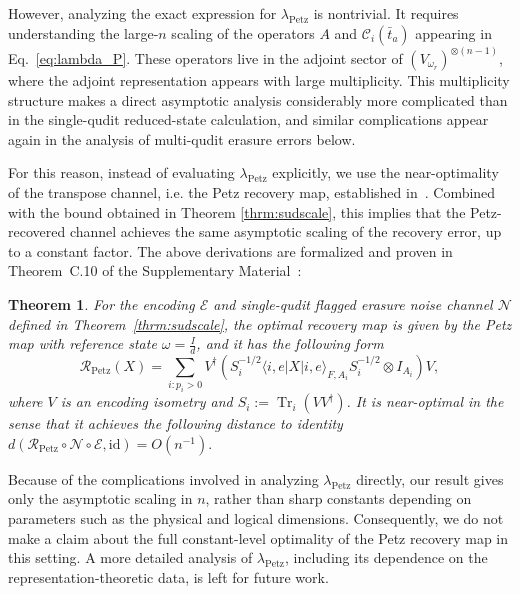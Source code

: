 \documentclass[10pt,twocolumn,superscriptaddress,aps,amsmath,amssymb,citeautoscript,floatfix,prx,longbibliography]{revtex4-2}
\newtheorem{theorem}{Theorem}
\theoremstyle{plain}
\theoremstyle{plain}
\theoremstyle{plain}
\theoremstyle{plain}
\theoremstyle{plain}
\theoremstyle{plain}
\begin{document}
However, analyzing the exact expression for \(\lambda_{\mathrm{Petz}}\) is nontrivial. It requires understanding the large-\(n\) scaling of the operators
\(A\) and \(\mathcal C_i(\bar t_a)\) appearing in Eq.~\eqref{eq:lambda_P}. These operators live in the adjoint sector of \((V_{\omega_r})^{\otimes(n-1)}\), where the adjoint representation appears with large multiplicity. This multiplicity
structure makes a direct asymptotic analysis considerably more complicated than in the single-qudit reduced-state calculation, and similar complications appear again in the analysis of multi-qudit erasure errors below.

For this reason, instead of evaluating \(\lambda_{\mathrm{Petz}}\) explicitly, we use the near-optimality of the transpose channel, i.e. the Petz recovery map, established in~\cite{Ng2010}. Combined with the bound obtained in Theorem \ref{thrm:sudscale}, this implies that the Petz-recovered channel achieves the same asymptotic scaling of the recovery error, up to a constant factor. The above derivations are formalized and proven in Theorem~C.10 of the Supplementary Material~\cite{SuppMat}:

\begin{theorem}
    For the encoding $\mathcal{E}$ and single-qudit flagged erasure noise channel $\mathcal{N}$ defined in Theorem~\ref{thrm:sudscale}, the optimal recovery map is given by the Petz map with reference state $\omega=\frac{I}{d}$, and it has the following form
    \[
        \mathcal{R}_{\mathrm{Petz}}(X)=\sum_{i: p_i>0} V^{\dagger}\left(S_i^{-1 / 2} \langle i, e| X|i,e\rangle_{F, A_i} S_i^{-1 / 2} \otimes I_{A_i}\right) V,
    \]
    where $V$ is an encoding isometry and $S_i:=\operatorname{Tr}_i\left(V V^{\dagger}\right)$. It is near-optimal in the sense that it achieves the following distance to identity
    $
        d\left(\mathcal{R}_{\text{Petz}} \circ \mathcal{N}\circ \mathcal{E}, \text {id}\right)=O\left(n^{-1}\right) .
    $
\end{theorem}

Because of the complications involved in analyzing \(\lambda_{\mathrm{Petz}}\) directly, our result gives only the asymptotic scaling in \(n\), rather than sharp constants depending on parameters such as the physical and logical dimensions. Consequently, we do not make a claim about the full constant-level optimality of the Petz recovery map in this setting. A more detailed analysis of \(\lambda_{\mathrm{Petz}}\), including its dependence on the representation-theoretic data, is left for future work.
\end{document}
